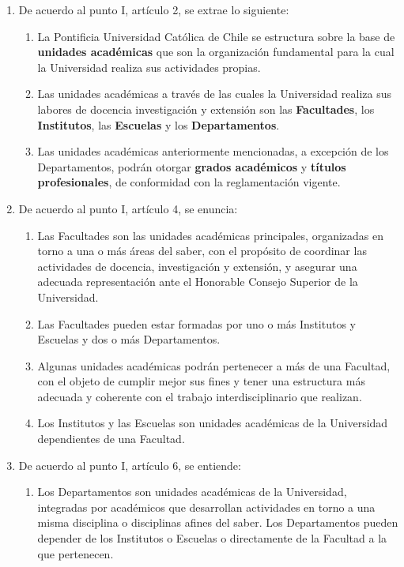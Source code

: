 \begin{enumerate}
  \item De acuerdo al punto I, artículo 2, se extrae lo siguiente:
    \begin{enumerate}
      \item La Pontificia Universidad Católica de Chile se estructura sobre la base de \textbf{unidades académicas} que son la organización fundamental para la cual la Universidad realiza sus actividades propias.
      \item Las unidades académicas a través de las cuales la Universidad realiza sus labores de docencia investigación y extensión son las \textbf{Facultades}, los \textbf{Institutos}, las \textbf{Escuelas} y los \textbf{Departamentos}.
      \item Las unidades académicas anteriormente mencionadas, a excepción de los Departamentos, podrán otorgar \textbf{grados académicos} y \textbf{títulos profesionales}, de conformidad con la reglamentación vigente.
    \end{enumerate}
  \item De acuerdo al punto I, artículo 4, se enuncia:
    \begin{enumerate}
      \item Las Facultades son las unidades académicas principales, organizadas en torno a una o más áreas del saber, con el propósito de coordinar las actividades de docencia, investigación y extensión, y asegurar una adecuada representación ante el Honorable Consejo Superior de la Universidad.
      \item Las Facultades pueden estar formadas por uno o más Institutos y Escuelas y dos o más Departamentos.
      \item Algunas unidades académicas podrán pertenecer a más de una Facultad, con el objeto de cumplir mejor sus fines y tener una estructura más adecuada y coherente con el trabajo interdisciplinario que realizan.
      \item Los Institutos y las Escuelas son unidades académicas de la Universidad dependientes de una Facultad.
    \end{enumerate}
  \item De acuerdo al punto I, artículo 6, se entiende:
    \begin{enumerate}
      \item Los Departamentos son unidades académicas de la Universidad, integradas por académicos que desarrollan actividades en torno a una misma disciplina o disciplinas afines del saber. Los Departamentos pueden depender de los Institutos o Escuelas o directamente de la Facultad a la que pertenecen.
    \end{enumerate}
\end{enumerate}

